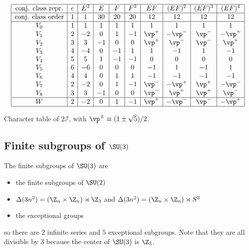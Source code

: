 \documentclass{worksheetclass}
\begin{document}
            \begin{table}[H]
                \centering
                {\small
                \begin{equation*}
                        \begin{array}{|c|c|c|c|c|c|c|c|c|c|}
                            \hline
                            \text{conj. class repr.} & e & E^2 & E & F & F^2 & EF & (EF)^2 & (EF)^3 & (EF)^4 \\ \hline
                            \text{conj. class order} & 1 & 1 & 30 & 20 & 20 & 12 & 12 & 12 & 12\\
                            \hline
                            V_0 & 1 & 1 & 1 & 1 & 1 & 1 & 1 & 1 & 1 \\
                            V_1 & 2 & -2 & 0 & 1 & -1 & \vp^+ & -\vp^- & \vp^- & -\vp^+ \\
                            V_2 & 3 & 3 & -1 & 0 & 0 & \vp^+ & \vp^- & \vp^- & \vp^+ \\
                            V_3 & 4 & -4 & 0 & -1 & 1 & 1 & -1 & 1 & -1 \\
                            V_4 & 5 & 5 & 1 & -1 & -1 & 0 & 0 & 0 & 0 \\
                            V_5 & 6 & -6 & 0 & 0 & 0 & -1 & 1 & -1 & 1 \\
                            V_6 & 4 & 4 & 0 & 1 & 1 & -1 & -1 & -1 & -1 \\
                            V_7 & 2 & -2 & 0 & 1 & -1 & \vp^- & -\vp^+ & \vp^+ & -\vp^- \\
                            V_8 & 3 & 3 & -1 & 0 & 0 & \vp^- & \vp^+ & \vp^+ & \vp^- \\ \hline
                            W & 2 & -2 & 0 & 1 & -1 & \vp^+ & -\vp^- & \vp^- & -\vp^+ \\ \hline
                        \end{array}
                    \end{equation*}}
                \caption{Character table of $2\mathcal{I}$, with $\vp^\pm\equiv(1\pm\sqrt{5})/2$.}
            \end{table}


    \subsection{Finite subgroups of $\SU(3)$}

        The finite subgroups of $\SU(3)$ are
        \begin{itemize}
            \item the finite subgroups of $\SU(2)$
            \item $\Delta(3n^2)=(\Z_n\times\Z_n)\rtimes\Z_3$ and $\Delta(3n^2)=(\Z_n\times\Z_n)\rtimes S^3$
            \item the exceptional groups
        \end{itemize}
        so there are $2$ infinite series and $5$ exceptional subgroups. Note that they are all divisible by $3$ because the center of $\SU(3)$ is $\Z_3$.
\end{document}
